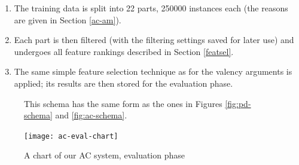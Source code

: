 \documentclass[12pt,notitlepage]{report}
\begin{document}
\begin{enumerate}
    \begin{enumerate}
        \item The training data is split into 22 parts, 250000 instances each (the reasons are given in Section \ref{ac-am}).
        \item Each part is then filtered (with the filtering settings saved for later use) and undergoes all feature rankings described in Section \ref{featsel}.
        \item The same simple feature selection technique as for the valency arguments is applied; its results are then stored for the evaluation phase.
    \end{enumerate}
\end{enumerate}

\begin{figure}[tb]\footnotesize
\caption{A chart of our AC system, evaluation phase}\label{fig:ac-eval}
\noindent This schema has the same form as the ones in Figures \ref{fig:pd-schema} and \ref{fig:ac-schema}.
\begin{center}
\texttt{[image: ac-eval-chart]}
\end{center}
\end{figure}
\end{document}
